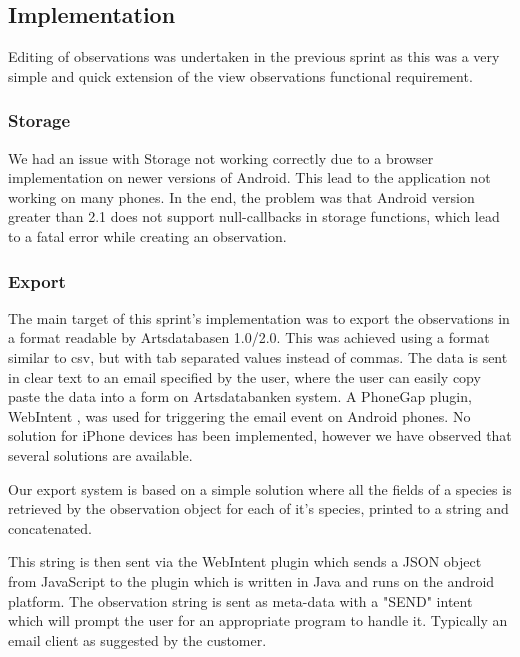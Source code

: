 \subsection{Implementation}

Editing of observations was undertaken in the previous sprint as this was a very simple and quick extension of the view observations functional requirement.

\subsubsection{Storage}

\label{sprint3:storage}

We had an issue with Storage not working correctly due to a browser
implementation on newer versions of Android. This lead to the application
not working on many  phones. In the end, the problem was that Android
version greater than 2.1 does not support null-callbacks in storage functions, which
lead to a fatal error while creating an observation.

	\subsubsection{Export}

	The main target of this sprint's implementation was to export the
	observations in a format readable by Artsdatabasen 1.0/2.0. This was achieved
	using a format similar to csv, but with tab separated values instead of
	commas. The data is sent in clear text to an email specified by the user,
	where the user can easily copy paste the data into a form on Artsdatabanken
	system. A PhoneGap plugin, WebIntent \cite{library:Webintent}, was used for triggering the email
	event on Android phones. No solution for iPhone devices has been implemented,
	however we have observed that several solutions are available.
	
	Our export system is based on a simple solution where all the fields of a species
	is retrieved by the observation object for each of it's species, printed to a string
	and concatenated.
	
	This string is then sent via the WebIntent plugin which sends a JSON object from
	JavaScript to the plugin which is written in Java and runs on the android platform.
	The observation string is sent as meta-data with a "SEND" intent which will prompt 
	the user for an appropriate program to handle it. Typically an email client as
	suggested by the customer.

